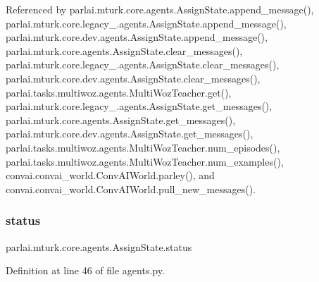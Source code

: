 Referenced by parlai.\+mturk.\+core.\+agents.\+Assign\+State.\+append\+\_\+message(), parlai.\+mturk.\+core.\+legacy\+\_.\+agents.\+Assign\+State.\+append\+\_\+message(), parlai.\+mturk.\+core.\+dev.\+agents.\+Assign\+State.\+append\+\_\+message(), parlai.\+mturk.\+core.\+agents.\+Assign\+State.\+clear\+\_\+messages(), parlai.\+mturk.\+core.\+legacy\+\_.\+agents.\+Assign\+State.\+clear\+\_\+messages(), parlai.\+mturk.\+core.\+dev.\+agents.\+Assign\+State.\+clear\+\_\+messages(), parlai.\+tasks.\+multiwoz.\+agents.\+Multi\+Woz\+Teacher.\+get(), parlai.\+mturk.\+core.\+legacy\+\_.\+agents.\+Assign\+State.\+get\+\_\+messages(), parlai.\+mturk.\+core.\+agents.\+Assign\+State.\+get\+\_\+messages(), parlai.\+mturk.\+core.\+dev.\+agents.\+Assign\+State.\+get\+\_\+messages(), parlai.\+tasks.\+multiwoz.\+agents.\+Multi\+Woz\+Teacher.\+num\+\_\+episodes(), parlai.\+tasks.\+multiwoz.\+agents.\+Multi\+Woz\+Teacher.\+num\+\_\+examples(), convai.\+convai\+\_\+world.\+Conv\+A\+I\+World.\+parley(), and convai.\+convai\+\_\+world.\+Conv\+A\+I\+World.\+pull\+\_\+new\+\_\+messages().

\mbox{\label{classparlai_1_1mturk_1_1core_1_1agents_1_1AssignState_a1d77495a7694cc88c937c06d4d4d039e}} 
\subsubsection{\texorpdfstring{status}{status}}
{\footnotesize\ttfamily parlai.\+mturk.\+core.\+agents.\+Assign\+State.\+status}



Definition at line 46 of file agents.\+py.



